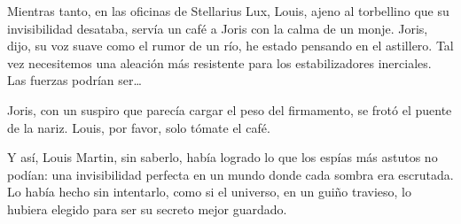Mientras tanto, en las oficinas de Stellarius Lux, Louis, ajeno al torbellino que su invisibilidad desataba, servía un café a Joris con la calma de un monje. \glqq Joris,\grqq~ dijo, su voz suave como el rumor de un río, \glqq he estado pensando en el astillero. Tal vez necesitemos una aleación más resistente para los estabilizadores inerciales. Las fuerzas podrían ser\ldots\grqq

Joris, con un suspiro que parecía cargar el peso del firmamento, se frotó el puente de la nariz. \glqq Louis, por favor, solo tómate el café.\grqq

Y así, Louis Martin, sin saberlo, había logrado lo que los espías más astutos no podían: una invisibilidad perfecta en un mundo donde cada sombra era escrutada. Lo había hecho sin intentarlo, como si el universo, en un guiño travieso, lo hubiera elegido para ser su secreto mejor guardado.
